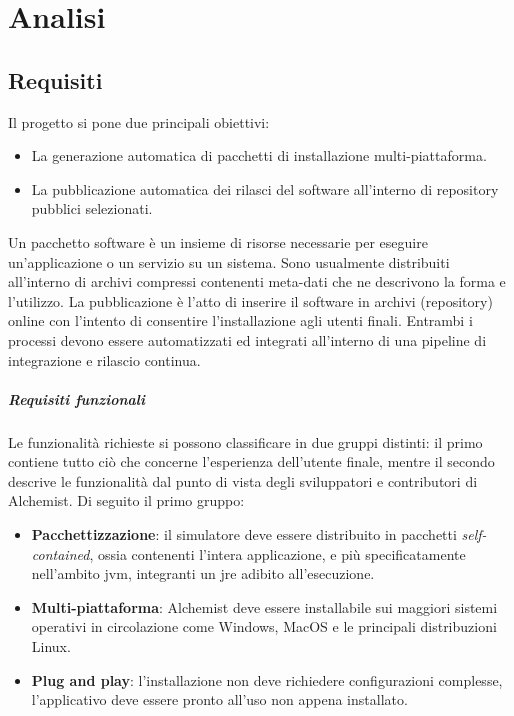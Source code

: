 
\chapter{Analisi}

\section{Requisiti}

Il progetto si pone due principali obiettivi:
\begin{itemize}
	\item La generazione automatica di pacchetti di installazione multi-piattaforma.
	\item La pubblicazione automatica dei rilasci del software all'interno di repository pubblici selezionati.
\end{itemize}
Un pacchetto software è un insieme di risorse necessarie per eseguire un'applicazione o un servizio su un sistema. Sono usualmente distribuiti all'interno di archivi compressi contenenti meta-dati che ne descrivono la forma e l'utilizzo. La pubblicazione è l'atto di inserire il software in archivi (repository) online con l'intento di consentire l'installazione agli utenti finali. Entrambi i processi devono essere automatizzati ed integrati all'interno di una pipeline di integrazione e rilascio continua.

\paragraph{Requisiti funzionali}

Le funzionalità richieste si possono classificare in due gruppi distinti: il primo contiene tutto ciò che concerne l'esperienza dell'utente finale, mentre il secondo descrive le funzionalità dal punto di vista degli sviluppatori e contributori di Alchemist. Di seguito il primo gruppo:
\begin{itemize}
	\item \textbf{Pacchettizzazione}: il simulatore deve essere distribuito in pacchetti \textit{self-contained}, ossia contenenti l'intera applicazione, e più specificatamente nell'ambito \ac{jvm}, integranti un \ac{jre} adibito all'esecuzione.
	\item \textbf{Multi-piattaforma}: Alchemist deve essere installabile sui maggiori sistemi operativi in circolazione come Windows, MacOS e le principali distribuzioni Linux.
	\item \textbf{Plug and play}: l'installazione non deve richiedere configurazioni complesse, l'applicativo deve essere pronto all'uso non appena installato.
\end{itemize}

